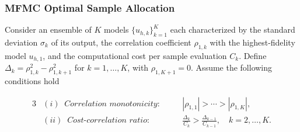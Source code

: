 \documentclass{beamer}
\begin{document}
\begin{frame}[t]
    \frametitle{MFMC Optimal Sample Allocation}
        {\fontsize{8}{8}\selectfont 
        \begin{theorem}
        \label{thm:Sample_size_est}
        Consider an ensemble of $K$ models $\{u_{h,k}\}_{k=1}^K$ each characterized by the standard deviation $\sigma_k$ of its output, the correlation coefficient $\rho_{1,k}$ with the highest-fidelity model $u_{h,1}$, and the computational cost per sample evaluation $C_k$. Define $\Delta_k = \rho_{1,k}^2 - \rho_{1,k+1}^2$ for $k = 1, \dots, K$, with $\rho_{1,K+1} = 0$. Assume the following conditions hold
        \vspace{-5mm}
        
        \begin{alignat*}{3}
        &(i)\;\; \textit{Correlation monotonicity}: \quad && |\rho_{1,1}| > \cdots > |\rho_{1,K}|, \\ 
        &(ii)\;\; \textit{Cost-correlation ratio}: \quad && \frac{\Delta_{k}}{C_k} > \frac{\Delta_{k-1}}{C_{k-1}}, \quad k=2,\ldots,K. 
        \end{alignat*}
        

\end{theorem}}
\end{frame}
\end{document}
